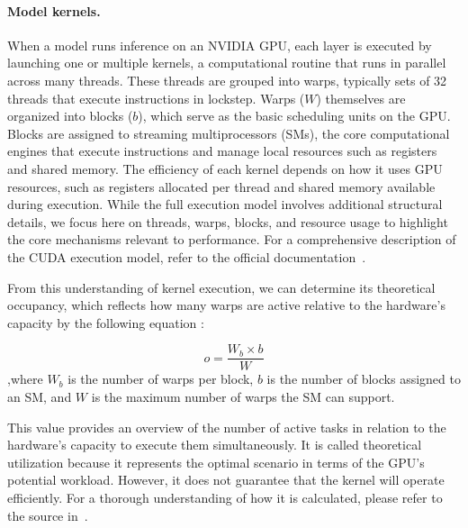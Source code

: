 
\paragraph{Model kernels.}

When a model runs inference on an NVIDIA GPU, each layer is executed by launching one or multiple kernels, a computational routine that runs in parallel across many threads. These threads are grouped into warps, typically sets of 32 threads that execute instructions in lockstep. Warps ($W$) themselves are organized into blocks ($b$), which serve as the basic scheduling units on the GPU. Blocks are assigned to streaming multiprocessors (SMs), the core computational engines that execute instructions and manage local resources such as registers and shared memory. The efficiency of each kernel depends on how it uses GPU resources, such as registers allocated per thread and shared memory available during execution. While the full execution model involves additional structural details, we focus here on threads, warps, blocks, and resource usage to highlight the core mechanisms relevant to performance. For a comprehensive description of the CUDA execution model, refer to the official documentation~\cite{nvidia2025cuda}.

From this understanding of kernel execution, we can determine its theoretical occupancy, which reflects how many warps are active relative to the hardware's capacity by the following equation :

\begin{equation}\label{eq:occupancy}
	o = \frac{W_b \times b}{W}
\end{equation}
,where $W_b$ is the number of warps per block, $b$ is the number of blocks assigned to an SM, and $W$ is the maximum number of warps the SM can support.

This value provides an overview of the number of active tasks in relation to the hardware's capacity to execute them simultaneously. It is called theoretical utilization because it represents the optimal scenario in terms of the GPU's potential workload. However, it does not guarantee that the kernel will operate efficiently. For a thorough understanding of how it is calculated, please refer to the source in~\cite{lim2017autotuninggpukernelsstatic}.

